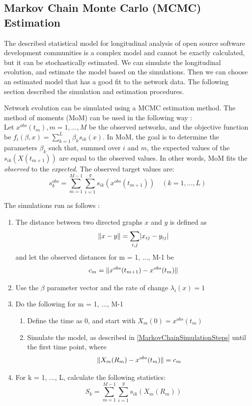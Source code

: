 \documentclass[12pt,letterpaper]{gthesis2}  %
\DeclarePairedDelimiter{\abs}{\lvert}{\rvert}
\DeclarePairedDelimiter{\norm}{\lVert}{\rVert}
\begin{document}
\subsection*{Markov Chain Monte Carlo (MCMC) Estimation}
\label{estimation}
The described statistical model for longitudinal analysis of open source software development communities is a complex model and cannot be exactly calculated, but it can be stochastically estimated. We can simulate the longitudinal evolution, and estimate the model based on the simulations. Then we can choose an estimated model that has a good fit to the network data.
The following section described the simulation and estimation procedures. 

Network evolution can be simulated using a MCMC estimation method. The method of moments (MoM) can be used in the following way \cite{Snijders2004}: \\

Let $x^{obs}(t_m), m = 1, ..., M$ be the observed networks, and the objective function be $f_i(\beta, x) = \sum_{k=1}^L \beta_k s_{ik}(x)$. 
In MoM, the goal is to determine the parameters $\beta_k$ such that, summed over $i$ and $m$, the expected values of the $s_{ik}(X(t_{m+1}))$ are equal to the observed values. In other words, MoM fits the \textit{observed} to the \textit{expected}. 
The observed target values are:
\begin{equation}
s_k^{obs} = \sum_{m=1}^{M-1}\sum_{i=1}^g s_{ik}(x^{obs}(t_{m+1})) \quad (k = 1, ..., L)
\end{equation}

The simulations run as follows \cite{Snijders2004}:
\begin{enumerate}
\item The distance between two directed graphs $x$ and $y$ is defined as
\begin{equation}
\norm{x -y} = \sum_{i,j}\abs{x_{ij} - y_{ij}}
\end{equation}
and let the observed distances for m = 1, ..., M-1 be 
\begin{equation}
c_m = \norm{x^{obs}(t_{m+1})-x^{obs}(t_m)}
\end{equation}
\item Use the $\beta$ parameter vector and the rate of change $\lambda_{i}(x) = 1$

\item Do the following for m = 1, ..., M-1
\begin{enumerate}
\item Define the time as 0, and start with $X_m(0) = x^{obs}(t_m)$
\item Simulate the model, as described in \ref{MarkovChainSimulationSteps} until the first time point, where 
\begin{equation}
\norm{X_m(R_m) - x^{obs}(t_m)} = c_m
\end{equation}
\end{enumerate}
\item For k = 1, ..., L, calculate the following statistics:
\begin{equation}
S_k = \sum_{m = 1}^{M-1}\sum_{i=1}^{g}s_{ik}(X_m(R_m))
\end{equation}
\end{enumerate}
\end{document}
